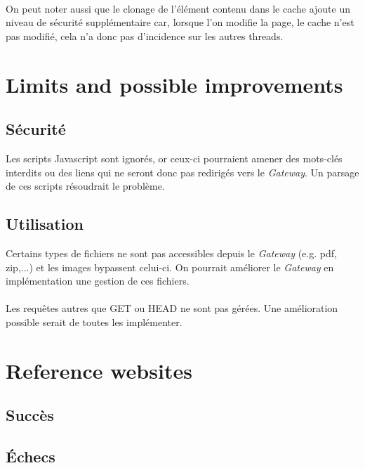 \documentclass[a4paper,11pt]{article}
\begin{document}
\paragraph{}
On peut noter aussi que le clonage de l'élément contenu dans le cache ajoute un niveau de sécurité supplémentaire car, lorsque l'on modifie la page, le cache n'est pas modifié, cela n'a donc pas d'incidence sur les autres threads.

\section{Limits and possible improvements}

	\subsection{Sécurité}
Les scripts Javascript sont ignorés, or ceux-ci pourraient amener des mots-clés interdits ou des liens qui ne seront donc pas redirigés vers le \textit{Gateway}. Un parsage de ces scripts résoudrait le problème. 

	\subsection{Utilisation}
Certains types de fichiers ne sont pas accessibles depuis le \textit{Gateway} (e.g. pdf, zip,...) et les images bypassent celui-ci. On pourrait améliorer le \textit{Gateway} en implémentation une gestion de ces fichiers.
\paragraph{}
Les requêtes autres que GET ou HEAD ne sont pas gérées. Une amélioration possible serait de toutes les implémenter.

\section{Reference websites}

	\subsection{Succès}

	\subsection{Échecs}
\end{document}
